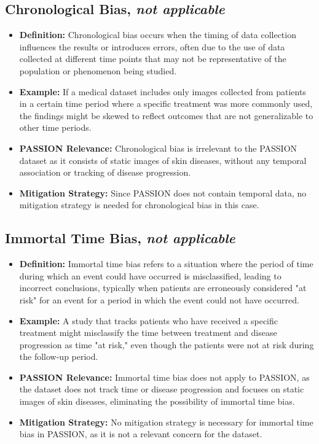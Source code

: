 \begin{refsection}
		\subsection{Chronological Bias, \textit{not applicable}}
		\begin{itemize}
			\item \textbf{Definition:} Chronological bias occurs when the timing of data collection influences the results or introduces errors, often due to the use of data collected at different time points that may not be representative of the population or phenomenon being studied.
			\item \textbf{Example:} If a medical dataset includes only images collected from patients in a certain time period where a specific treatment was more commonly used, the findings might be skewed to reflect outcomes that are not generalizable to other time periods.
			\item \textbf{PASSION Relevance:} Chronological bias is irrelevant to the PASSION dataset as it consists of static images of skin diseases, without any temporal association or tracking of disease progression.
			\item \textbf{Mitigation Strategy:} Since PASSION does not contain temporal data, no mitigation strategy is needed for chronological bias in this case.
		\end{itemize}
		\subsection{Immortal Time Bias, \textit{not applicable}}
		\begin{itemize}
			\item \textbf{Definition:} Immortal time bias refers to a situation where the period of time during which an event could have occurred is misclassified, leading to incorrect conclusions, typically when patients are erroneously considered "at risk" for an event for a period in which the event could not have occurred.
			\item \textbf{Example:} A study that tracks patients who have received a specific treatment might misclassify the time between treatment and disease progression as time "at risk," even though the patients were not at risk during the follow-up period.
			\item \textbf{PASSION Relevance:} Immortal time bias does not apply to PASSION, as the dataset does not track time or disease progression and focuses on static images of skin diseases, eliminating the possibility of immortal time bias.
			\item \textbf{Mitigation Strategy:} No mitigation strategy is necessary for immortal time bias in PASSION, as it is not a relevant concern for the dataset.
		\end{itemize}
		

\end{refsection}
